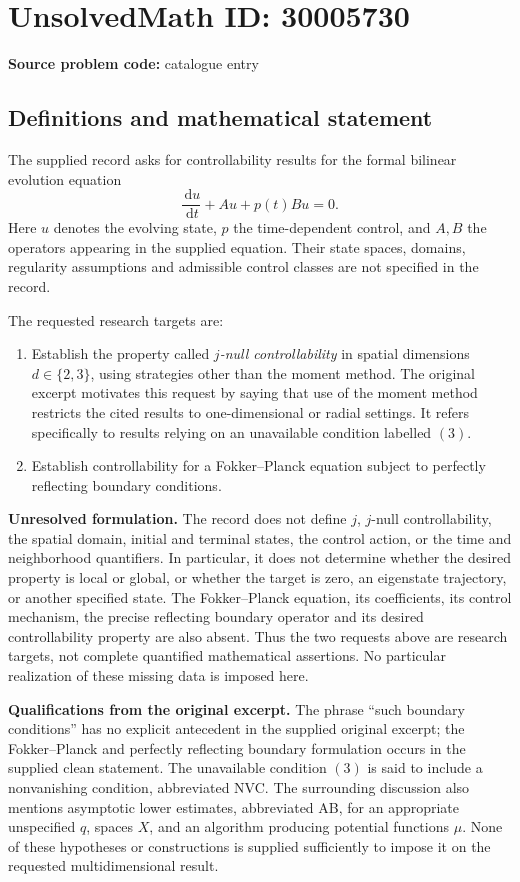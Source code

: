 \documentclass[11pt]{article}
\newcommand{\dd}{\,\mathrm{d}}
\begin{document}
\section*{UnsolvedMath ID: 30005730}
\textbf{Source problem code:} catalogue entry
\subsection{Definitions and mathematical statement}
The supplied record asks for controllability results for the formal bilinear evolution equation
\[
\frac{\dd u}{\dd t}+Au+p(t)Bu=0.
\]
Here \(u\) denotes the evolving state, \(p\) the time-dependent control, and \(A,B\) the operators appearing in the supplied equation. Their state spaces, domains, regularity assumptions and admissible control classes are not specified in the record.

The requested research targets are:
\begin{enumerate}
\item Establish the property called \emph{\(j\)-null controllability} in spatial dimensions \(d\in\{2,3\}\), using strategies other than the moment method. The original excerpt motivates this request by saying that use of the moment method restricts the cited results to one-dimensional or radial settings. It refers specifically to results relying on an unavailable condition labelled \((3)\).
\item Establish controllability for a Fokker--Planck equation subject to perfectly reflecting boundary conditions.
\end{enumerate}

\textbf{Unresolved formulation.} The record does not define \(j\), \(j\)-null controllability, the spatial domain, initial and terminal states, the control action, or the time and neighborhood quantifiers. In particular, it does not determine whether the desired property is local or global, or whether the target is zero, an eigenstate trajectory, or another specified state. The Fokker--Planck equation, its coefficients, its control mechanism, the precise reflecting boundary operator and its desired controllability property are also absent. Thus the two requests above are research targets, not complete quantified mathematical assertions. No particular realization of these missing data is imposed here.

\textbf{Qualifications from the original excerpt.} The phrase ``such boundary conditions'' has no explicit antecedent in the supplied original excerpt; the Fokker--Planck and perfectly reflecting boundary formulation occurs in the supplied clean statement. The unavailable condition \((3)\) is said to include a nonvanishing condition, abbreviated NVC. The surrounding discussion also mentions asymptotic lower estimates, abbreviated AB, for an appropriate unspecified \(q\), spaces \(X\), and an algorithm producing potential functions \(\mu\). None of these hypotheses or constructions is supplied sufficiently to impose it on the requested multidimensional result.
\end{document}
